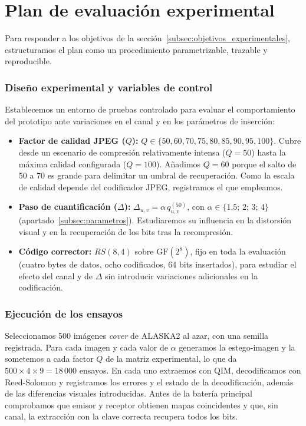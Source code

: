 \documentclass[IB]{TFUOC}%
\begin{document}
\section{Plan de evaluación experimental}
\label{sec:plan_experimental}

Para responder a los objetivos de la sección~\ref{subsec:objetivos_experimentales}, estructuramos el plan como un procedimiento parametrizable, trazable y reproducible.

\subsubsection{Diseño experimental y variables de control}

Establecemos un entorno de pruebas controlado para evaluar el comportamiento del prototipo ante variaciones en el canal y en los parámetros de inserción:

\begin{itemize}
    \item \textbf{Factor de calidad JPEG ($Q$):} $Q\in\{50, 60, 70, 75, 80, 85, 90, 95, 100\}$. Cubre desde un escenario de compresión relativamente intensa ($Q=50$) hasta la máxima calidad configurada ($Q=100$). Añadimos $Q=60$ porque el salto de 50 a 70 es grande para delimitar un umbral de recuperación. Como la escala de calidad depende del codificador JPEG, registramos el que empleamos.
    \item \textbf{Paso de cuantificación ($\Delta$):} $\Delta_{u,v}=\alpha\,q^{(50)}_{u,v}$, con $\alpha\in\{1{.}5;\,2;\,3;\,4\}$ (apartado~\ref{subsec:parametros}). Estudiaremos su influencia en la distorsión visual y en la recuperación de los bits tras la recompresión.
    \item \textbf{Código corrector:} $RS(8,4)$ sobre $\mathrm{GF}(2^8)$, fijo en toda la evaluación (cuatro bytes de datos, ocho codificados, 64 bits insertados), para estudiar el efecto del canal y de $\Delta$ sin introducir variaciones adicionales en la codificación.
\end{itemize}

\subsubsection{Ejecución de los ensayos}

Seleccionamos 500 imágenes \textit{cover} de ALASKA2 al azar, con una semilla registrada. Para cada imagen y cada valor de $\alpha$ generamos la estego-imagen y la sometemos a cada factor $Q$ de la matriz experimental, lo que da $500\times4\times9=18\,000$ ensayos. En cada uno extraemos con QIM, decodificamos con Reed-Solomon y registramos los errores y el estado de la decodificación, además de las diferencias visuales introducidas. Antes de la batería principal comprobamos que emisor y receptor obtienen mapas coincidentes y que, sin canal, la extracción con la clave correcta recupera todos los bits.
\end{document}
